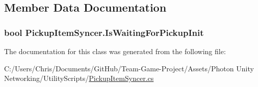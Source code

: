 \subsection{Member Data Documentation}
\subsubsection[{\texorpdfstring{Is\+Waiting\+For\+Pickup\+Init}{IsWaitingForPickupInit}}]{\setlength{\rightskip}{0pt plus 5cm}bool Pickup\+Item\+Syncer.\+Is\+Waiting\+For\+Pickup\+Init}\hypertarget{class_pickup_item_syncer_a825d5218c87edf22d2bd28c104017303}{}\label{class_pickup_item_syncer_a825d5218c87edf22d2bd28c104017303}


The documentation for this class was generated from the following file\+:\begin{DoxyCompactItemize}
\item 
C\+:/\+Users/\+Chris/\+Documents/\+Git\+Hub/\+Team-\/\+Game-\/\+Project/\+Assets/\+Photon Unity Networking/\+Utility\+Scripts/\hyperlink{_pickup_item_syncer_8cs}{Pickup\+Item\+Syncer.\+cs}\end{DoxyCompactItemize}
